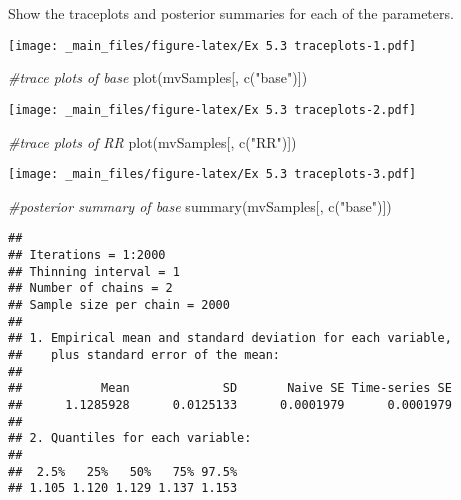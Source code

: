\documentclass[
]{book}
\newenvironment{Shaded}{\begin{snugshade}}{\end{snugshade}}
\newcommand{\CommentTok}[1]{\textcolor[rgb]{0.56,0.35,0.01}{\textit{#1}}}
\newcommand{\FunctionTok}[1]{\textcolor[rgb]{0.00,0.00,0.00}{#1}}
\newcommand{\NormalTok}[1]{#1}
\newcommand{\OtherTok}[1]{\textcolor[rgb]{0.56,0.35,0.01}{#1}}
\newcommand{\SpecialCharTok}[1]{\textcolor[rgb]{0.00,0.00,0.00}{#1}}
\newcommand{\StringTok}[1]{\textcolor[rgb]{0.31,0.60,0.02}{#1}}
\begin{document}
Show the traceplots and posterior summaries for each of the parameters.

\begin{Shaded}
\end{Shaded}

\texttt{[image: \_main\_files/figure-latex/Ex 5.3 traceplots-1.pdf]}

\begin{Shaded}
\begin{Highlighting}[]
\CommentTok{\#trace plots of base}
\FunctionTok{plot}\NormalTok{(mvSamples[, }\FunctionTok{c}\NormalTok{(}\StringTok{"base"}\NormalTok{)])}
\end{Highlighting}
\end{Shaded}

\texttt{[image: \_main\_files/figure-latex/Ex 5.3 traceplots-2.pdf]}

\begin{Shaded}
\begin{Highlighting}[]
\CommentTok{\#trace plots of RR}
\FunctionTok{plot}\NormalTok{(mvSamples[, }\FunctionTok{c}\NormalTok{(}\StringTok{"RR"}\NormalTok{)])}
\end{Highlighting}
\end{Shaded}

\texttt{[image: \_main\_files/figure-latex/Ex 5.3 traceplots-3.pdf]}

\begin{Shaded}
\begin{Highlighting}[]
\CommentTok{\#posterior summary of base}
\FunctionTok{summary}\NormalTok{(mvSamples[, }\FunctionTok{c}\NormalTok{(}\StringTok{"base"}\NormalTok{)])}
\end{Highlighting}
\end{Shaded}

\begin{verbatim}
## 
## Iterations = 1:2000
## Thinning interval = 1 
## Number of chains = 2 
## Sample size per chain = 2000 
## 
## 1. Empirical mean and standard deviation for each variable,
##    plus standard error of the mean:
## 
##           Mean             SD       Naive SE Time-series SE 
##      1.1285928      0.0125133      0.0001979      0.0001979 
## 
## 2. Quantiles for each variable:
## 
##  2.5%   25%   50%   75% 97.5% 
## 1.105 1.120 1.129 1.137 1.153
\end{verbatim}
\end{document}
